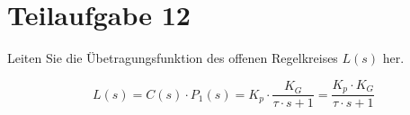 \section{Teilaufgabe 12}
\begin{aufgabe}
Leiten Sie die Übetragungsfunktion des offenen Regelkreises $L(s)$ her.
\end{aufgabe}
\[ L(s) = C(s) \cdot P_1(s) = K_p \cdot \frac{K_G}{\tau \cdot s + 1} 
    = \frac{K_p \cdot K_G}{\tau \cdot s + 1} \]
